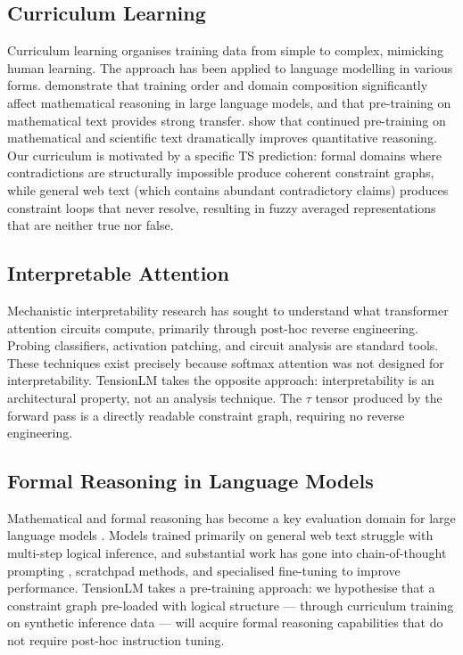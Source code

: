 \documentclass[10pt,a4paper]{article}
\begin{document}
\subsection{Curriculum Learning}

Curriculum learning \cite{bengio2009curriculum} organises training data from simple to complex, mimicking human learning. The approach has been applied to language modelling in various forms. \citet{azerbayev2023llemma} demonstrate that training order and domain composition significantly affect mathematical reasoning in large language models, and that pre-training on mathematical text provides strong transfer. \citet{lewkowycz2022solving} show that continued pre-training on mathematical and scientific text dramatically improves quantitative reasoning. Our curriculum is motivated by a specific TS prediction: formal domains where contradictions are structurally impossible produce coherent constraint graphs, while general web text (which contains abundant contradictory claims) produces constraint loops that never resolve, resulting in fuzzy averaged representations that are neither true nor false.

\subsection{Interpretable Attention}

Mechanistic interpretability research \cite{elhage2021mathematical, olsson2022context} has sought to understand what transformer attention circuits compute, primarily through post-hoc reverse engineering. Probing classifiers, activation patching, and circuit analysis are standard tools. These techniques exist precisely because softmax attention was not designed for interpretability. TensionLM takes the opposite approach: interpretability is an architectural property, not an analysis technique. The $\tau$ tensor produced by the forward pass is a directly readable constraint graph, requiring no reverse engineering.

\subsection{Formal Reasoning in Language Models}

Mathematical and formal reasoning has become a key evaluation domain for large language models \cite{hendrycks2021measuring, cobbe2021training}. Models trained primarily on general web text struggle with multi-step logical inference, and substantial work has gone into chain-of-thought prompting \cite{wei2022chain}, scratchpad methods, and specialised fine-tuning to improve performance. TensionLM takes a pre-training approach: we hypothesise that a constraint graph pre-loaded with logical structure --- through curriculum training on synthetic inference data --- will acquire formal reasoning capabilities that do not require post-hoc instruction tuning.
\end{document}
